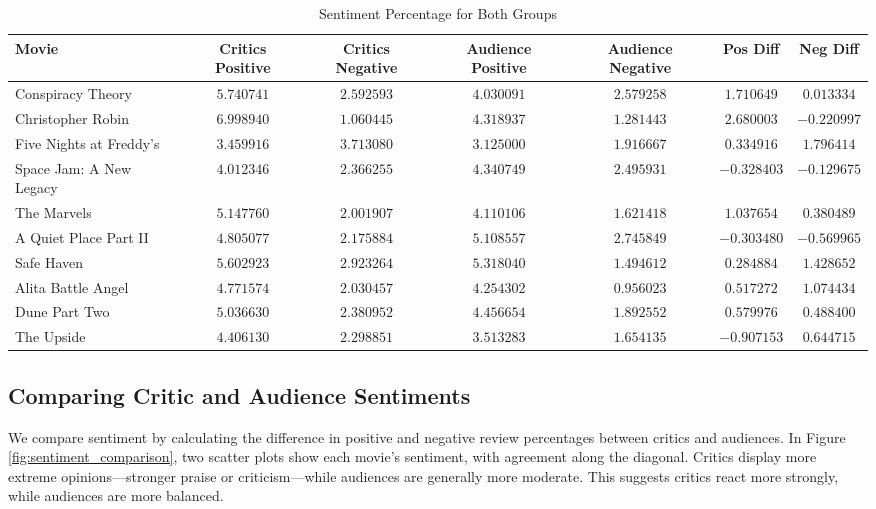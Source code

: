 \documentclass{article}
\begin{document}
\begin{table}[ht]
    \centering
    \caption{Sentiment Percentage for Both Groups}
    \scriptsize
    \begin{tabular}{lcccccc}
        \toprule
        \textbf{Movie} & \textbf{Critics Positive} & \textbf{Critics Negative} & \textbf{Audience Positive} & \textbf{Audience Negative} & \textbf{Pos Diff} & \textbf{Neg Diff} \\
        \midrule
        Conspiracy Theory & $5.740741$ & $2.592593$ & $4.030091$ & $2.579258$ & $1.710649$ & $0.013334$ \\
        Christopher Robin & $6.998940$ & $1.060445$ & $4.318937$ & $1.281443$ & $2.680003$ & $-0.220997$ \\
        Five Nights at Freddy's & $3.459916$ & $3.713080$ & $3.125000$ & $1.916667$ & $0.334916$ & $1.796414$ \\
        Space Jam: A New Legacy & $4.012346$ & $2.366255$ & $4.340749$ & $2.495931$ & $-0.328403$ & $-0.129675$ \\
        The Marvels & $5.147760$ & $2.001907$ & $4.110106$ & $1.621418$ & $1.037654$ & $0.380489$ \\
        A Quiet Place Part II & $4.805077$ & $2.175884$ & $5.108557$ & $2.745849$ & $-0.303480$ & $-0.569965$ \\
        Safe Haven & $5.602923$ & $2.923264$ & $5.318040$ & $1.494612$ & $0.284884$ & $1.428652$ \\
        Alita Battle Angel & $4.771574$ & $2.030457$ & $4.254302$ & $0.956023$ & $0.517272$ & $1.074434$ \\
        Dune Part Two & $5.036630$ & $2.380952$ & $4.456654$ & $1.892552$ & $0.579976$ & $0.488400$ \\
        The Upside & $4.406130$ & $2.298851$ & $3.513283$ & $1.654135$ & $-0.907153$ & $0.644715$ \\
        \bottomrule
    \end{tabular}
    \label{tab:sentiment_percentage}
\end{table}

\subsection{Comparing Critic and Audience Sentiments}
We compare sentiment by calculating the difference in positive and negative review percentages between critics and audiences. In Figure \ref{fig:sentiment_comparison}, two scatter plots show each movie’s sentiment, with agreement along the diagonal. Critics display more extreme opinions—stronger praise or criticism—while audiences are generally more moderate. This suggests critics react more strongly, while audiences are more balanced.
\end{document}
